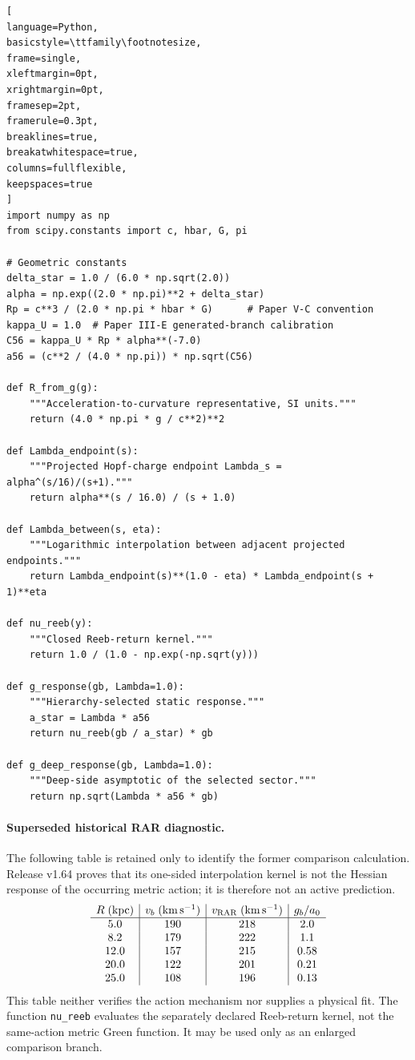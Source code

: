 \documentclass[12pt,a4paper]{article}
\begin{document}
\begin{lstlisting}[
language=Python,
basicstyle=\ttfamily\footnotesize,
frame=single,
xleftmargin=0pt,
xrightmargin=0pt,
framesep=2pt,
framerule=0.3pt,
breaklines=true,
breakatwhitespace=true,
columns=fullflexible,
keepspaces=true
]
import numpy as np
from scipy.constants import c, hbar, G, pi

# Geometric constants
delta_star = 1.0 / (6.0 * np.sqrt(2.0))
alpha = np.exp((2.0 * np.pi)**2 + delta_star)
Rp = c**3 / (2.0 * np.pi * hbar * G)      # Paper V-C convention
kappa_U = 1.0  # Paper III-E generated-branch calibration
C56 = kappa_U * Rp * alpha**(-7.0)
a56 = (c**2 / (4.0 * np.pi)) * np.sqrt(C56)

def R_from_g(g):
    """Acceleration-to-curvature representative, SI units."""
    return (4.0 * np.pi * g / c**2)**2

def Lambda_endpoint(s):
    """Projected Hopf-charge endpoint Lambda_s = alpha^(s/16)/(s+1)."""
    return alpha**(s / 16.0) / (s + 1.0)

def Lambda_between(s, eta):
    """Logarithmic interpolation between adjacent projected endpoints."""
    return Lambda_endpoint(s)**(1.0 - eta) * Lambda_endpoint(s + 1)**eta

def nu_reeb(y):
    """Closed Reeb-return kernel."""
    return 1.0 / (1.0 - np.exp(-np.sqrt(y)))

def g_response(gb, Lambda=1.0):
    """Hierarchy-selected static response."""
    a_star = Lambda * a56
    return nu_reeb(gb / a_star) * gb

def g_deep_response(gb, Lambda=1.0):
    """Deep-side asymptotic of the selected sector."""
    return np.sqrt(Lambda * a56 * gb)
\end{lstlisting}

\paragraph{Superseded historical RAR diagnostic.}
The following table is retained only to identify the former comparison
calculation.  Release v1.64 proves that its one-sided interpolation kernel is
not the Hessian response of the occurring metric action; it is therefore not
an active prediction.
\[
\begin{array}{c|c|c|c}
R\;({\rm kpc}) & v_b\;({\rm km\,s^{-1}}) & v_{\rm RAR}\;({\rm km\,s^{-1}}) & g_b/a_0\\
\hline
5.0 & 190 & 218 & 2.0\\
8.2 & 179 & 222 & 1.1\\
12.0 & 157 & 215 & 0.58\\
20.0 & 122 & 201 & 0.21\\
25.0 & 108 & 196 & 0.13
\end{array}
\]
This table neither verifies the action mechanism nor supplies a physical fit.
The function \texttt{nu\_reeb} evaluates the separately declared Reeb-return
kernel, not the same-action metric Green function.  It may be used only as an
enlarged comparison branch.
\end{document}
